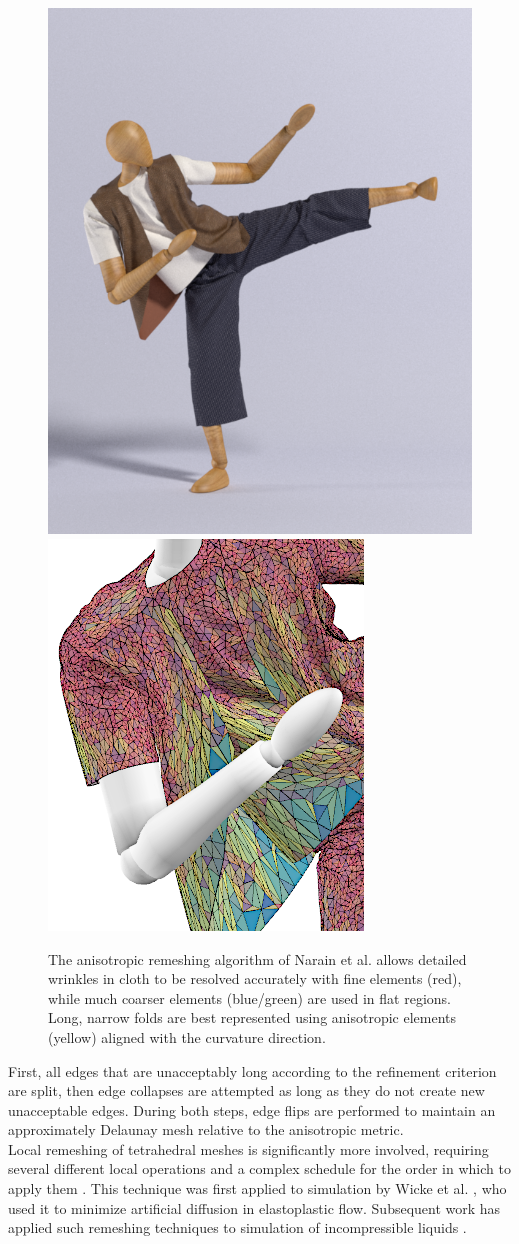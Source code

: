 \begin{figure}[!h]
	\centering
	\includegraphics[width=0.35\linewidth]{images/starAdaptivity-cgf2016/cloth-render.png}
	\includegraphics[width=0.35\linewidth]{images/starAdaptivity-cgf2016/cloth-wire-zoom.png}
	\caption[STAR adaptivity: Anisotropic remeshing of triangular meshes]{The anisotropic remeshing algorithm of Narain et al. \cite{Narain2012} allows detailed wrinkles in cloth to be resolved accurately with fine elements (red), while much coarser elements (blue/green) are used in flat regions. Long, narrow folds are best represented using anisotropic elements (yellow) aligned with the curvature direction.}
	\label{fig:Narain2012}
\end{figure}
First, all edges that are unacceptably long according to the refinement criterion are split, then edge collapses are attempted as long as they do not create new unacceptable edges.
During both steps, edge flips are performed to maintain an approximately Delaunay mesh relative to the anisotropic metric.
\\
Local remeshing of tetrahedral meshes is significantly more involved, requiring several different local operations and a complex schedule for the order in which to apply them \cite{Klingner2007}.
This technique was first applied to simulation by Wicke et al. \cite{Wicke2010}, who used it to minimize artificial diffusion in elastoplastic flow.
Subsequent work has applied such remeshing techniques to simulation of incompressible liquids \cite{Misztal2012a,Misztal2012b,Clausen2013}.
